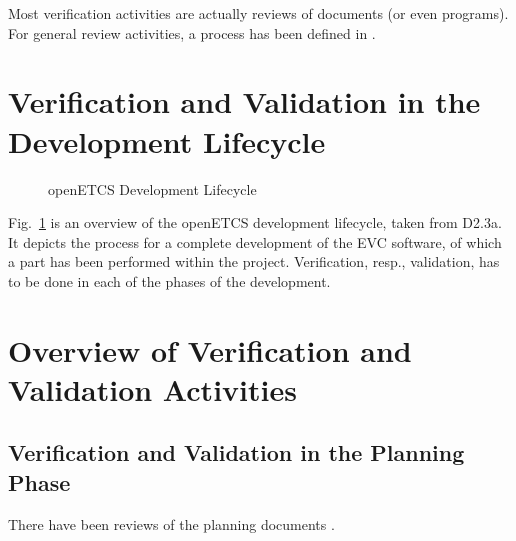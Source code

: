 \documentclass{template/openetcs_article}
\begin{document}
Most verification activities are actually reviews of documents (or
even programs). For general review activities, a process has been
defined in \cite{openETCS:D1.3.1}. 

\newpage







\section{Verification and Validation in the Development Lifecycle}
\label{sec:Lifecycle}

\begin{figure}[hbt]
  \centering
  \def\svgwidth{.9\textwidth}
  {\tiny
  }
  \caption{openETCS Development Lifecycle}
  \label{fig:lifecycle2}
\end{figure}

Fig.~\ref{fig:lifecycle2} is an overview of the openETCS development
lifecycle, taken from D2.3a. It depicts the process for a complete
development of the EVC software, of which a part has been performed
within the project. Verification, resp., validation, has to be done in
each of the phases of the development.

\section{Overview of Verification and Validation Activities}
\label{sec:overview}


\subsection{Verification and Validation in the Planning Phase}
\label{sec:vnv-0}

There have been reviews of the planning documents . 


\end{document}
